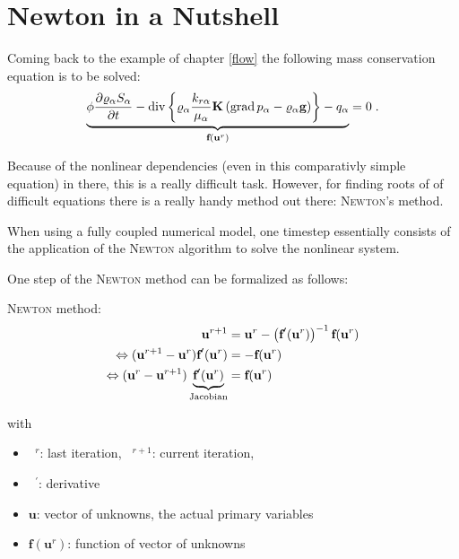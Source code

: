 

\chapter{Newton in a Nutshell}
Coming back to the example of chapter \ref{flow} the following mass conservation equation is to be solved: 
\begin{align}
\underbrace{
  \phi \frac{\partial \varrho_\alpha S_\alpha}{\partial t}
 -
 \text{div} \left\{
 \varrho_\alpha \frac{k_{r\alpha}}{\mu_\alpha} \mbox{\bf K} \left(\text{grad}\, p_\alpha - \varrho_{\alpha} \mbox{\bf g} \right)
 \right\} - q_\alpha} _
{\textbf{f}(\textbf{u}^r)}
= 0 \; .
\end{align}

Because of the nonlinear dependencies (even in this comparativly simple equation) in there, this is a really difficult task. However, for finding roots of of difficult equations there is a really handy method out there: \textsc{Newton}'s method. 

When using a fully coupled numerical model, one timestep essentially consists of the application of the \textsc{Newton} algorithm to solve the nonlinear system.

One step of the \textsc{Newton} method can be formalized as follows:

\textsc{Newton} method: 
\begin{subequations}
\begin{align}
\label{NewtonGen}
\textbf{u}^{r+1} &= \textbf{u}^r -  \left(\textbf{f}^\prime (\textbf{u}^r) \right)^{-1} \textbf{f}(\textbf{u}^r) \\
\Leftrightarrow ( \textbf{u}^{r+1}-\textbf{u}^r) {\textbf{f}^{\prime}(\textbf{u}^r)} &= -\textbf{f}(\textbf{u}^r) \\
\Leftrightarrow ( \textbf{u}^r - \textbf{u}^{r+1}) \underbrace{\textbf{f}^{\prime}(\textbf{u}^r)}_{\textnormal{Jacobian}} &= \textbf{f}(\textbf{u}^r) \label{NewtonAsUsed}
\end{align}
\end{subequations}

\noindent with
\begin{itemize}
\item $\phantom{a}^r$: last iteration, $\phantom{a}^{r+1}$: current iteration,
\item $\phantom{a}^\prime$: derivative
\item $\textbf{u}$: vector of unknowns, the actual primary variables
\item $\textbf{f}(\textbf{u}^r)$: function of vector of unknowns
\end{itemize}

